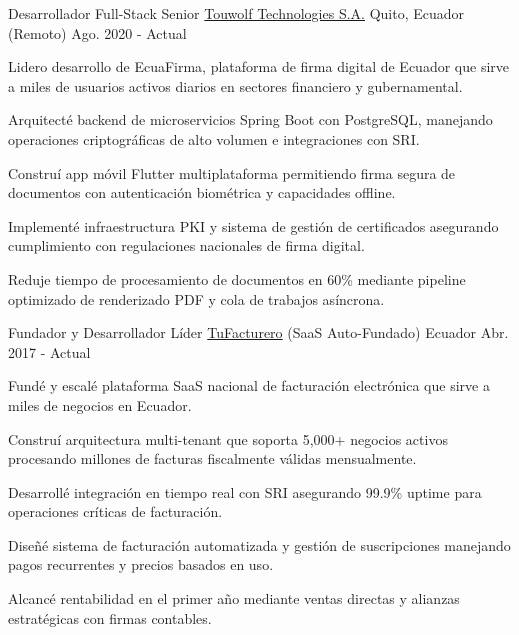 
\begin{cventries}

  \cventry
    {Desarrollador Full-Stack Senior} %
    {\href{https://touwolf.com/}{Touwolf Technologies S.A.}} %
    {Quito, Ecuador (Remoto)} %
    {Ago. 2020 - Actual} %
    {
      \begin{cvitems} %
        \item {Lidero desarrollo de EcuaFirma, plataforma de firma digital de Ecuador que sirve a miles de usuarios activos diarios en sectores financiero y gubernamental.}
        \item {Arquitecté backend de microservicios Spring Boot con PostgreSQL, manejando operaciones criptográficas de alto volumen e integraciones con SRI.}
        \item {Construí app móvil Flutter multiplataforma permitiendo firma segura de documentos con autenticación biométrica y capacidades offline.}
        \item {Implementé infraestructura PKI y sistema de gestión de certificados asegurando cumplimiento con regulaciones nacionales de firma digital.}
        \item {Reduje tiempo de procesamiento de documentos en 60\% mediante pipeline optimizado de renderizado PDF y cola de trabajos asíncrona.}
      \end{cvitems}
    }

  \cventry
    {Fundador y Desarrollador Líder} %
    {\href{https://tufacturero.ec}{TuFacturero} (SaaS Auto-Fundado)} %
    {Ecuador} %
    {Abr. 2017 - Actual} %
    {
      \begin{cvitems} %
        \item {Fundé y escalé plataforma SaaS nacional de facturación electrónica que sirve a miles de negocios en Ecuador.}
        \item {Construí arquitectura multi-tenant que soporta 5,000+ negocios activos procesando millones de facturas fiscalmente válidas mensualmente.}
        \item {Desarrollé integración en tiempo real con SRI asegurando 99.9\% uptime para operaciones críticas de facturación.}
        \item {Diseñé sistema de facturación automatizada y gestión de suscripciones manejando pagos recurrentes y precios basados en uso.}
        \item {Alcancé rentabilidad en el primer año mediante ventas directas y alianzas estratégicas con firmas contables.}
      \end{cvitems}
    }


\end{cventries}
